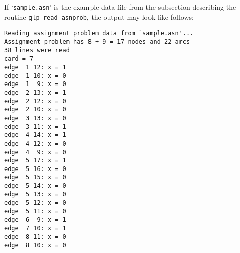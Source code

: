 If `\verb|sample.asn|' is the example data file from the subsection
describing the routine \verb|glp_read_asnprob|, the output may look
like follows:

\begin{footnotesize}
\begin{verbatim}
Reading assignment problem data from `sample.asn'...
Assignment problem has 8 + 9 = 17 nodes and 22 arcs
38 lines were read
card = 7
edge  1 12: x = 1
edge  1 10: x = 0
edge  1  9: x = 0
edge  2 13: x = 1
edge  2 12: x = 0
edge  2 10: x = 0
edge  3 13: x = 0
edge  3 11: x = 1
edge  4 14: x = 1
edge  4 12: x = 0
edge  4  9: x = 0
edge  5 17: x = 1
edge  5 16: x = 0
edge  5 15: x = 0
edge  5 14: x = 0
edge  5 13: x = 0
edge  5 12: x = 0
edge  5 11: x = 0
edge  6  9: x = 1
edge  7 10: x = 1
edge  8 11: x = 0
edge  8 10: x = 0
\end{verbatim}
\end{footnotesize}

